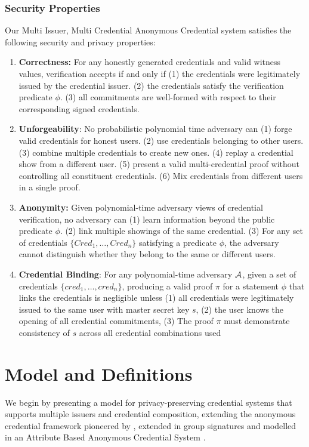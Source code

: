 \subsubsection{Security Properties}
Our Multi Issuer, Multi Credential Anonymous Credential system satisfies the following security and privacy properties:
\begin{enumerate}
    \item \textbf{Correctness: } For any honestly generated credentials and valid witness values, verification accepts if and only if (1) the credentials were legitimately issued by the credential issuer. (2) the credentials satisfy the verification predicate $\phi$. (3) all commitments are well-formed with respect to their corresponding signed credentials. 
    
    \item \textbf{Unforgeability}: No probabilistic polynomial time adversary can (1) forge valid credentials for honest users. (2) use credentials belonging to other users. (3) combine multiple credentials to create new ones. (4) replay a credential show from a different user. (5) present a valid multi-credential proof without controlling all constituent credentials. (6) Mix credentials from different users in a single proof.
    
    \item \textbf{Anonymity:} Given polynomial-time adversary views of credential verification, no adversary can (1) learn information beyond the public predicate $\phi$. (2) link multiple showings of the same credential. (3) For any set of credentials $\{Cred_1,\dots,Cred_n\}$ satisfying a predicate $\phi$, the adversary cannot distinguish whether they belong to the same or different users.

    \item \textbf{Credential Binding}: For any polynomial-time adversary $\mathcal{A}$, given a set of credentials $\{cred_1, \dots, cred_n \}$, producing a valid proof $\pi$ for a statement $\phi$ that links the credentials is negligible unless (1) all credentials were legitimately issued to the same user with master secret key $s$, (2) the user knows the opening of all credential commitments, (3) The proof $\pi$ must demonstrate consistency of $s$ across all credential combinations used

\end{enumerate}

\section{Model and Definitions}
We begin by presenting a model for privacy-preserving credential systems that supports multiple issuers and credential composition, extending the anonymous credential framework pioneered by \cite{hutchison_signature_2004}, extended in group signatures \cite{hutchison_foundations_2005} and modelled in an Attribute Based Anonymous Credential System \cite{fuchsbauer_structure-preserving_2019}.

